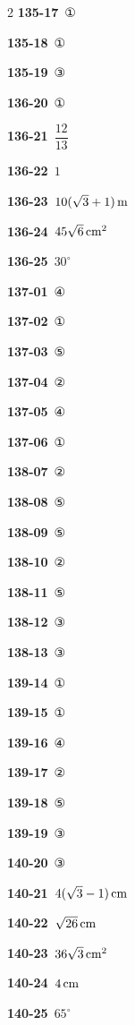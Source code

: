\documentclass[10pt,a4paper]{article}
\begin{document}
\begin{multicols}{2}
\noindent\textbf{135-17}\ ①\par
\noindent\textbf{135-18}\ ①\par
\noindent\textbf{135-19}\ ③\par
\noindent\textbf{136-20}\ ①\par
\noindent\textbf{136-21}\ $\dfrac{12}{13}$\par
\noindent\textbf{136-22}\ $1$\par
\noindent\textbf{136-23}\ $10(\sqrt{3}+1)\mkern3mu \mathrm{m}$\par
\noindent\textbf{136-24}\ $45\sqrt{6}\mkern3mu \mathrm{cm}^2$\par
\noindent\textbf{136-25}\ $30^\circ$\par
\noindent\textbf{137-01}\ ④\par
\noindent\textbf{137-02}\ ①\par
\noindent\textbf{137-03}\ ⑤\par
\noindent\textbf{137-04}\ ②\par
\noindent\textbf{137-05}\ ④\par
\noindent\textbf{137-06}\ ①\par
\noindent\textbf{138-07}\ ②\par
\noindent\textbf{138-08}\ ⑤\par
\noindent\textbf{138-09}\ ⑤\par
\noindent\textbf{138-10}\ ②\par
\noindent\textbf{138-11}\ ⑤\par
\noindent\textbf{138-12}\ ③\par
\noindent\textbf{138-13}\ ③\par
\noindent\textbf{139-14}\ ①\par
\noindent\textbf{139-15}\ ①\par
\noindent\textbf{139-16}\ ④\par
\noindent\textbf{139-17}\ ②\par
\noindent\textbf{139-18}\ ⑤\par
\noindent\textbf{139-19}\ ③\par
\noindent\textbf{140-20}\ ③\par
\noindent\textbf{140-21}\ $4(\sqrt{3}-1)\mkern3mu \mathrm{cm}$\par
\noindent\textbf{140-22}\ $\sqrt{26}\mkern3mu \mathrm{cm}$\par
\noindent\textbf{140-23}\ $36\sqrt{3}\mkern3mu \mathrm{cm}^2$\par
\noindent\textbf{140-24}\ $4\mkern3mu \mathrm{cm}$\par
\noindent\textbf{140-25}\ $65^\circ$\par

\end{multicols}
\end{document}
